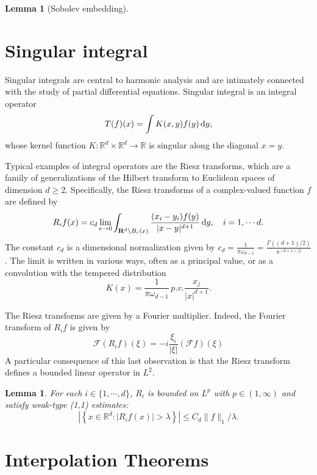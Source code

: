 \documentclass[twoside, 12pt]{book}
\numberwithin{equation}{chapter}
\newtheorem{lemma}[theorem]{Lemma}
\def\mR{{\mathbb R}}
\def\l{\left}
\def\r{\right}
\def\geq{\geqslant}
\def\leq{\leqslant}
\def\d{\text{\rm{d}}}
\begin{document}
	\begin{lemma}[Sobolev embedding]
		
	\end{lemma}
	
	\section{Singular integral}
	Singular integrals are central to harmonic analysis and are intimately connected with the study of partial differential equations. Singular integral is an integral operator
	\[
	    T(f)(x)=\int K(x,y)f(y)\,\d y,
	\]
	whose kernel function $K: \mR^d\times\mR^d\to \mR$ is singular along the diagonal $x=y$. 
	
	Typical examples of integral operators are the Riesz transforms, which are a family of generalizations of the Hilbert transform to Euclidean spaces of dimension $d\geq 2$. Specifically, the Riesz transforms of a complex-valued function $f$ are defined by 
	\[
	    R_{i}f(x)=c_{d}\lim _{\epsilon \to 0}\int _{\mathbf {R}^{d}\backslash B_{\epsilon }(x)}{\frac {(x_{i}-y_{i})f(y)}{|x-y|^{d+1}}}\,\d y, \quad i=1,\cdots d. 
	\]
	The constant $c_d$ is a dimensional normalization given by $c_d={\frac {1}{\pi \omega _{d-1}}}=\frac {\Gamma((d+1)/2)}{\pi ^{(d+1)/2}}$. 
	The limit is written in various ways, often as a principal value, or as a convolution with the tempered distribution
	\[
	    K(x)={\frac {1}{\pi \omega _{d-1}}}\,p.v.{\frac {x_{j}}{|x|^{d+1}}}.
	\]
	
	The Riesz transforms are given by a Fourier multiplier. Indeed, the Fourier transform of $R_i f$ is given by 
	\[
	    \mathcal{F} (R_{i}f)(\xi)=-i \frac{\xi_{i}}{|\xi|} (\mathcal{F} f)(\xi)
	\] 
	A particular consequence of this last observation is that the Riesz transform defines a bounded linear operator in $L^2$.
	
	\begin{lemma}
		For each $i\in \{1,\cdots, d\}$, $R_i$ is bounded on $L^p$ with $p\in (1,\infty)$ and satisfy weak-type (1,1) estimates: 
		\begin{equation}
			\l| \l\{x\in \mR^d:  |R_i f(x)|>\lambda \r\}\r|\leq C_d \|f\|_1/\lambda. 
		\end{equation}
	\end{lemma}
	
    \section{Interpolation Theorems} 
    
\end{document}
